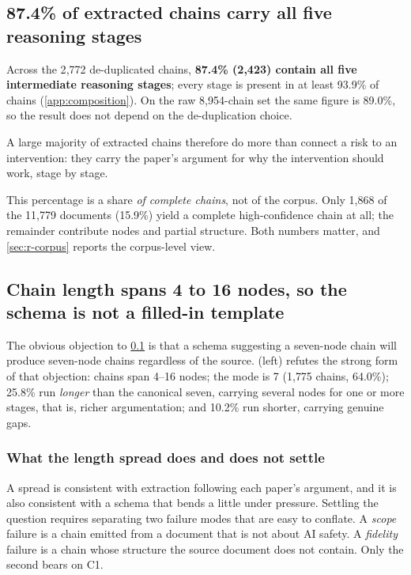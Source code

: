 \documentclass[10pt,twocolumn,letterpaper]{article}
\begin{document}
\subsection{87.4\% of extracted chains carry all five reasoning stages}
\label{sec:r-stages}

Across the 2{,}772 de-duplicated chains, \textbf{87.4\% (2{,}423) contain all five
intermediate reasoning stages}; every stage is present in at least 93.9\% of chains
(\cref{app:composition}). On the raw 8{,}954-chain set the same figure is 89.0\%, so the
result does not depend on the de-duplication choice.

A large majority of extracted chains therefore do more than connect a risk to an
intervention: they carry the paper's argument for why the intervention should work,
stage by stage.

This percentage is a share \emph{of complete chains}, not of the corpus. Only 1{,}868 of
the 11{,}779 documents (15.9\%) yield a complete high-confidence chain at all; the
remainder contribute nodes and partial structure. Both numbers matter, and
\cref{sec:r-corpus} reports the corpus-level view.

\subsection{Chain length spans 4 to 16 nodes, so the schema is not a filled-in template}
\label{sec:r-template}

The obvious objection to \cref{sec:r-stages} is that a schema suggesting a seven-node
chain will produce seven-node chains regardless of the source.  (left)
refutes the strong form of that objection: chains span 4--16 nodes; the mode is 7
(1{,}775 chains, 64.0\%); 25.8\% run \emph{longer} than the canonical seven, carrying
several nodes for one or more stages, that is, richer argumentation; and 10.2\% run
shorter, carrying genuine gaps.

\subsubsection{What the length spread does and does not settle}

A spread is consistent with extraction following each paper's argument, and it is also
consistent with a schema that bends a little under pressure. Settling the question
requires separating two failure modes that are easy to conflate. A \emph{scope} failure
is a chain emitted from a document that is not about AI safety. A \emph{fidelity}
failure is a chain whose structure the source document does not contain. Only the second
bears on C1.
\end{document}
